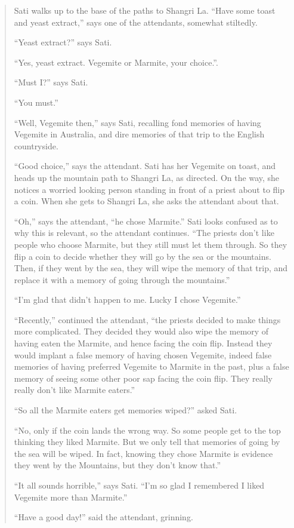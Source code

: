 \documentclass[
  11pt,
  letterpaper,
  DIV=11,
  numbers=noendperiod,
  twoside]{scrartcl}
\begin{document}
\begin{quote}
Sati walks up to the base of the paths to Shangri La. ``Have some toast
and yeast extract,'' says one of the attendants, somewhat stiltedly.

``Yeast extract?'' says Sati.

``Yes, yeast extract. Vegemite or Marmite, your choice.''.

``Must I?'' says Sati.

``You must.''

``Well, Vegemite then,'' says Sati, recalling fond memories of having
Vegemite in Australia, and dire memories of that trip to the English
countryside.

``Good choice,'' says the attendant. Sati has her Vegemite on toast, and
heads up the mountain path to Shangri La, as directed. On the way, she
notices a worried looking person standing in front of a priest about to
flip a coin. When she gets to Shangri La, she asks the attendant about
that.

``Oh,'' says the attendant, ``he chose Marmite.'' Sati looks confused as
to why this is relevant, so the attendant continues. ``The priests don't
like people who choose Marmite, but they still must let them through. So
they flip a coin to decide whether they will go by the sea or the
mountains. Then, if they went by the sea, they will wipe the memory of
that trip, and replace it with a memory of going through the
mountains.''

``I'm glad that didn't happen to me. Lucky I chose Vegemite.''

``Recently,'' continued the attendant, ``the priests decided to make
things more complicated. They decided they would also wipe the memory of
having eaten the Marmite, and hence facing the coin flip. Instead they
would implant a false memory of having chosen Vegemite, indeed false
memories of having preferred Vegemite to Marmite in the past, plus a
false memory of seeing some other poor sap facing the coin flip. They
really really don't like Marmite eaters.''

``So all the Marmite eaters get memories wiped?'' asked Sati.

``No, only if the coin lands the wrong way. So some people get to the
top thinking they liked Marmite. But we only tell that memories of going
by the sea will be wiped. In fact, knowing they chose Marmite is
evidence they went by the Mountains, but they don't know that.''

``It all sounds horrible,'' says Sati. ``I'm so glad I remembered I
liked Vegemite more than Marmite.''

``Have a good day!'' said the attendant, grinning.
\end{quote}
\end{document}
